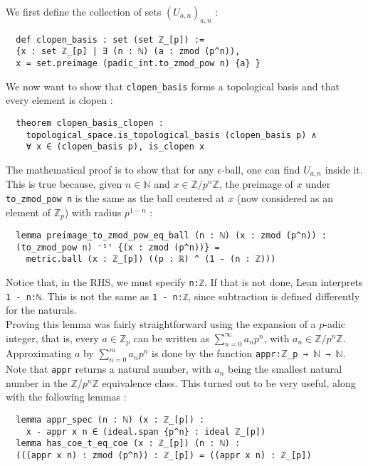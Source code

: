 \documentclass[a4paper,UKenglish,cleveref, autoref, thm-restate]{lipics-v2021}
\newcommand{\lean}[1]{\texttt{#1}\xspace} %
\begin{document}
We first define the collection of sets $(U_{a,n})_{a,n}$ :
\begin{lstlisting}
  def clopen_basis : set (set ℤ_[p]) := 
  {x : set ℤ_[p] | ∃ (n : ℕ) (a : zmod (p^n)),
  x = set.preimage (padic_int.to_zmod_pow n) {a} }
\end{lstlisting}

We now want to show that \lean{clopen\_basis} forms a topological basis and that every element is
clopen :
\begin{lstlisting}
  theorem clopen_basis_clopen : 
    topological_space.is_topological_basis (clopen_basis p) ∧
    ∀ x ∈ (clopen_basis p), is_clopen x
\end{lstlisting}
The mathematical proof is to show that for any $\epsilon$-ball, one can find $U_{a,n}$ inside it.
This is true because, given $n \in \mathbb{N}$ and $x \in \mathbb{Z} / p^n \mathbb{Z}$, the preimage of $x$ 
under \lean{to\_zmod\_pow n} is the same as the ball centered at $x$ (now considered as an element of $\mathbb{Z}_p$) with radius $p^{1 - n}$ :
\begin{lstlisting}
  lemma preimage_to_zmod_pow_eq_ball (n : ℕ) (x : zmod (p^n)) : 
  (to_zmod_pow n) ⁻¹' {(x : zmod (p^n))} = 
    metric.ball (x : ℤ_[p]) ((p : ℝ) ^ (1 - (n : ℤ)))
\end{lstlisting}

Notice that, in the RHS, we must specify \lean{n:ℤ}. If that is not done, Lean interprets \lean{1 - n:ℕ}. This is not the same as 
\lean{1 - n:ℤ}, since subtraction is defined differently for the naturals. \\
Proving this lemma was fairly straightforward using the expansion of a $p$-adic integer, that is, every
$a \in \mathbb{Z}_p$ can be written as $\sum_{n = 0}^{\infty} a_n p^n$, with $a_n \in \mathbb{Z}/p^n \mathbb{Z}$.
Approximating $a$ by $\sum_{n = 0}^{m} a_n p^n$ is done by the function \lean{appr:$\mathbb{Z}$\_p → $\mathbb{N}$ → $\mathbb{N}$}.
Note that \lean{appr} returns a natural number, with $a_n$ being the smallest natural number in the
$\mathbb{Z}/p^n \mathbb{Z}$ equivalence class. This turned out to be very useful, along with the
following lemmas :

\begin{lstlisting}
  lemma appr_spec (n : ℕ) (x : ℤ_[p]) :  
    x - appr x n ∈ (ideal.span {p^n} : ideal ℤ_[p])
  lemma has_coe_t_eq_coe (x : ℤ_[p]) (n : ℕ) :
  (((appr x n) : zmod (p^n)) : ℤ_[p]) = ((appr x n) : ℤ_[p])
\end{lstlisting}
\end{document}
